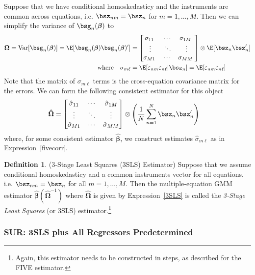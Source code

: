 \documentclass[12pt]{article}
\theoremstyle{plain}
\theoremstyle{definition}
\newtheorem{defn}[thm]{Definition}
\theoremstyle{remark}
\newcommand{\bsbeta}{\boldsymbol{\beta}}
\newcommand{\bsOmega}{\boldsymbol{\Omega}}
\newcommand{\bshatbeta}{\boldsymbol{\hat{\beta}}}
\newcommand{\bshatOmega}{\boldsymbol{\hat{\Omega}}}
\newcommand{\Var}{\operatorname{Var}}
\newcommand{\sumnN}{\sum^N_{n=1}}
\begin{document}
Suppose that we have conditional homoskedasticy and the instruments are
common across equations, i.e. $\bsz_{nm}=\bsz_n$ for $m=1,\ldots,M$.
Then we can simplify the variance of $\bsg_n(\bsbeta)$ to
\begin{align*}
  \bsOmega =
    \Var[\bsg_n(\bsbeta)]
    =
    \E[\bsg_n(\bsbeta)\bsg_n(\bsbeta)']
    &=
    \begin{bmatrix}
      \sigma_{11}\;
      &\cdots &
      \sigma_{1M}\;
      \\
      \vdots & \ddots & \vdots
      \\
      \sigma_{M1}\;
      &\cdots &
      \sigma_{MM}\;
    \end{bmatrix}
    \otimes
    \E[\bsz_{n}\bsz_{n}']
    \\
    \text{where}\quad
    \sigma_{m\ell}
    &= \E[\varepsilon_{nm}\varepsilon_{n\ell}|\bsz_n]
    = \E[\varepsilon_{nm}\varepsilon_{n\ell}]
\end{align*}
Note that the matrix of $\sigma_{m\ell}$ terms is the cross-equation
covariance matrix for the errors.
We can form the following consistent estimator for this object
\begin{align}
  \bshatOmega
    &=
    \begin{bmatrix}
      \hat{\sigma}_{11}
      &\cdots &
      \hat{\sigma}_{1M}
      \\
      \vdots & \ddots & \vdots
      \\
      \hat{\sigma}_{M1}
      &\cdots &
      \hat{\sigma}_{MM}
    \end{bmatrix}
    \otimes
    \left(
    \frac{1}{N}\sumnN \bsz_n\bsz_n'
    \right)
    \label{3SLS}
\end{align}
where, for some consistent estimator $\bshatbeta$,
we construct estimates $\hat{\sigma}_{m\ell}$ as in
Expression~\ref{fivecorr}.

\begin{defn}
(3-Stage Least Squares (3SLS) Estimator)
Suppose that we assume conditional homoskedasticy and a common
instruments vector for all equations, i.e. $\bsz_{nm}=\bsz_n$ for all
$m=1,\ldots,M$. Then the multiple-equation GMM estimator
$\bshatbeta(\bshatOmega^{-1})$ where $\bshatOmega$ is given by
Expression~\ref{3SLS} is called the \emph{3-Stage Least Squares} (or
3SLS) estimator.\footnote{%
  Again, this estimator needs to be constructed in steps, as described
  for the FIVE estimator.
}
\end{defn}

\subsubsection{SUR: 3SLS plus All Regressors Predetermined}
\end{document}
